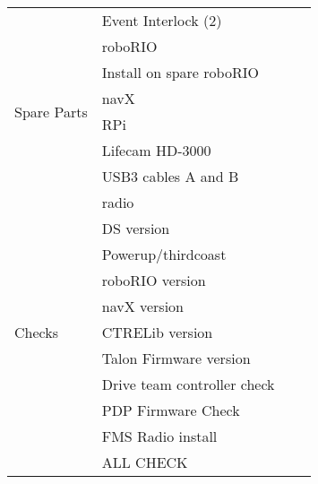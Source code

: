 \documentclass[12pt]{extarticle}
\begin{document}
\begin{tabular}{l|l|l|l}
\multirow{8}{*}{Spare Parts}
& Event Interlock (2) & \\ \cline{2-3}
& roboRIO & \\ \cline{2-3}
& Install on spare roboRIO    & \\ \cline{2-3}
& navX & \\ \cline{2-3}
& RPi & \\ \cline{2-3}
& Lifecam HD-3000 & \\ \cline{2-3}
& USB3 cables A and B & \\ \cline{2-3}
& radio & \\ \hline \hline

\multirow{9}{*}{Checks}     &  DS version &\\ \cline{2-3}
&  Powerup/thirdcoast &\\ \cline{2-3}
& roboRIO version & \\ \cline{2-3}
& navX version & \\ \cline{2-3}
& CTRELib version & \\ \cline{2-3}
& Talon Firmware version & \\ \cline{2-3}
& Drive team controller check & \\ \cline{2-3}
﻿& PDP Firmware Check & \\ \cline{2-3}
& FMS Radio install & \\ \hline \hline \hline

& ALL CHECK     &  \\ \cline{2-3}

\end{tabular}
\end{document}
